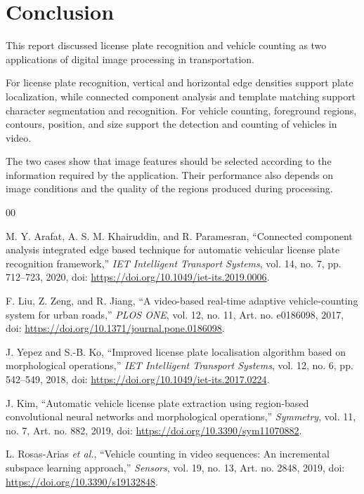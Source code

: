 \documentclass[conference]{IEEEtran}
\begin{document}
	
	
	\section{Conclusion}
	
	This report discussed license plate recognition and vehicle counting as
	two applications of digital image processing in transportation.
	
	For license plate recognition, vertical and horizontal edge densities
	support plate localization, while connected component analysis and
	template matching support character segmentation and recognition. For
	vehicle counting, foreground regions, contours, position, and size
	support the detection and counting of vehicles in video.
	
	The two cases show that image features should be selected according to
	the information required by the application. Their performance also
	depends on image conditions and the quality of the regions produced
	during processing.
	

	
	\begin{thebibliography}{00}
		
		M. Y. Arafat, A. S. M. Khairuddin, and R. Paramesran,
		``Connected component analysis integrated edge based technique for
		automatic vehicular license plate recognition framework,''
		\textit{IET Intelligent Transport Systems}, vol. 14, no. 7,
		pp. 712--723, 2020, doi: \url{https://doi.org/10.1049/iet-its.2019.0006}.
		
		F. Liu, Z. Zeng, and R. Jiang,
		``A video-based real-time adaptive vehicle-counting system for urban roads,''
		\textit{PLOS ONE}, vol. 12, no. 11, Art. no. e0186098, 2017,
		doi: \url{https://doi.org/10.1371/journal.pone.0186098}.
		
		J. Yepez and S.-B. Ko,
		``Improved license plate localisation algorithm based on morphological operations,''
		\textit{IET Intelligent Transport Systems}, vol. 12, no. 6,
		pp. 542--549, 2018, doi: \url{https://doi.org/10.1049/iet-its.2017.0224}.
		
		J. Kim,
		``Automatic vehicle license plate extraction using region-based
		convolutional neural networks and morphological operations,''
		\textit{Symmetry}, vol. 11, no. 7, Art. no. 882, 2019,
		doi: \url{https://doi.org/10.3390/sym11070882}.
		
		L. Rosas-Arias \textit{et al.},
		``Vehicle counting in video sequences: An incremental subspace learning approach,''
		\textit{Sensors}, vol. 19, no. 13, Art. no. 2848, 2019,
		doi: \url{https://doi.org/10.3390/s19132848}.
		
	\end{thebibliography}
	
\end{document}
